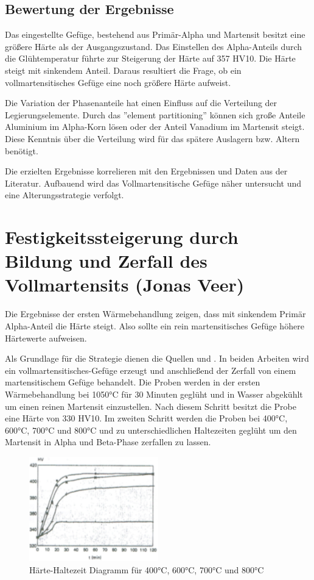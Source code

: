 \documentclass[a4paper, 11pt]{tubsreprt}
\begin{document}
\subsection{Bewertung der Ergebnisse}
Das eingestellte Gefüge, bestehend aus Primär-Alpha und Martensit besitzt eine größere Härte als der Ausgangszustand. Das Einstellen des Alpha-Anteils durch die Glühtemperatur führte zur Steigerung der Härte auf 357 HV10. Die Härte steigt mit sinkendem Anteil. Daraus resultiert die Frage, ob ein vollmartensitisches Gefüge eine noch größere Härte aufweist.

Die Variation der Phasenanteile hat einen Einfluss auf die Verteilung der Legierungselemente. Durch das ''element partitioning'' können sich große Anteile Aluminium im Alpha-Korn lösen oder der Anteil Vanadium im Martensit steigt. Diese Kenntnis über die Verteilung wird für das spätere Auslagern bzw. Altern benötigt. 

Die erzielten Ergebnisse korrelieren mit den Ergebnissen und Daten aus der Literatur. Aufbauend wird das Vollmartensitische Gefüge näher untersucht und eine Alterungsstrategie verfolgt.   

\newpage
\section{Festigkeitssteigerung durch Bildung und Zerfall des Vollmartensits (Jonas Veer)}\label{Kapitel Bildung und Zerfall des Vollmartensits}
Die Ergebnisse der ersten Wärmebehandlung zeigen, dass mit sinkendem Primär Alpha-Anteil die Härte steigt. Also sollte ein rein martensitisches Gefüge höhere Härtewerte aufweisen. 

Als Grundlage für die Strategie dienen die Quellen \cite{Mur1995} und \cite{Tarin1995}. In beiden Arbeiten wird ein vollmartensitisches-Gefüge erzeugt und anschließend der Zerfall von einem martensitischem Gefüge behandelt. Die Proben werden in der ersten Wärmebehandlung bei 1050°C für 30 Minuten geglüht und in Wasser abgekühlt um einen reinen Martensit einzustellen. Nach diesem Schritt besitzt die Probe eine Härte von 330 HV10. Im zweiten Schritt werden die Proben bei 400°C, 600°C, 700°C und 800°C und zu unterschiedlichen Haltezeiten geglüht um den Martensit in Alpha und Beta-Phase zerfallen zu lassen. 

\begin{figure}
\centering
\includegraphics[width=0.5\textwidth]{Bilder/HaerteHaltezeitdiagramm.png}
\caption[Härte-Haltezeit Diagramm]{Härte-Haltezeit Diagramm für 400°C, 600°C, 700°C und 800°C \cite{Mur1995}}
\label{Härtehaltezeitdigramm}
\end{figure}
\end{document}
